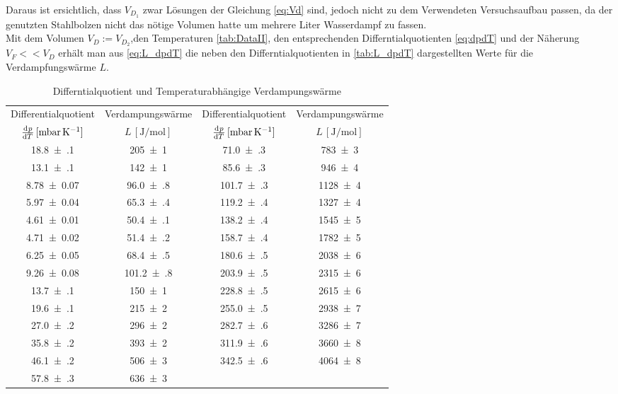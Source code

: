 	Daraus ist ersichtlich, dass $V_{D_{1}}$ zwar Lösungen der Gleichung \eqref{eq:Vd} sind, jedoch nicht zu dem Verwendeten Versuchsaufbau
	passen, da der genutzten Stahlbolzen nicht das nötige Volumen hatte um mehrere Liter Wasserdampf zu fassen.\\
	Mit dem Volumen $V_{D} := V_{D_{2}}$,den Temperaturen \autoref{tab:DataII}, den entsprechenden Differntialquotienten \eqref{eq:dpdT} und der Näherung $V_{F} << V_{D}$ erhält man 
	aus \eqref{eq:L_dpdT} die neben den Differntialquotienten in \autoref{tab:L_dpdT} dargestellten Werte für die Verdampfungswärme $L$.
	
	\begin{table}[!h]
		\centering
		\begin{tabular}{|c|c||c|c|}
			\hline
			Differentialquotient & Verdampungswärme & Differentialquotient & Verdampungswärme\\
			$\od{p}{T}\,[\si[prefixes-as-symbols = true]{\milli\bar\per\kelvin}]$ & 
			$L\,[\si{\joule\per\mole}]$ & $\od{p}{T}\,[\si[prefixes-as-symbols = true]{\milli\bar\per\kelvin}]$ & 
			$L\,[\si{\joule\per\mole}]$\\ \hline\hline
				\num{18.8(1)}  & \num{205(1)} & \num{71.0(3)}  & \num{783(3)} \\
				\num{13.1(1)}  & \num{142(1)} & \num{85.6(3)}  & \num{946(4)} \\
				\num{8.78(7)}  & \num{96.0(8)} &\num{101.7(3)}  & \num{1128(4)} \\
				\num{5.97(4)}  & \num{65.3(4)} &\num{119.2(4)}  & \num{1327(4)} \\
				\num{4.61(1)}  & \num{50.4(1)} &\num{138.2(4)}  & \num{1545(5)} \\
				\num{4.71(2)}  & \num{51.4(2)} &\num{158.7(4)}  & \num{1782(5)} \\
				\num{6.25(5)}  & \num{68.4(5)} &\num{180.6(5)}  & \num{2038(6)} \\
				\num{9.26(8)}  & \num{101.2(8)} &\num{203.9(5)}  & \num{2315(6)} \\
				\num{13.7(1)}  & \num{150(1)} &\num{228.8(5)}  & \num{2615(6)} \\
				\num{19.6(1)}  & \num{215(2)} &\num{255.0(5)}  & \num{2938(7)} \\
				\num{27.0(2)}  & \num{296(2)} &\num{282.7(6)}  & \num{3286(7)} \\
				\num{35.8(2)}  & \num{393(2)} &\num{311.9(6)}  & \num{3660(8)} \\
				\num{46.1(2)}  & \num{506(3)} &\num{342.5(6)}  & \num{4064(8)} \\
				\num{57.8(3)}  & \num{636(3)} & & \\
			\hline
		\end{tabular}
		\caption{Differntialquotient und Temperaturabhängige Verdampungswärme \label{tab:L_dpdT}}
	\end{table}
	
